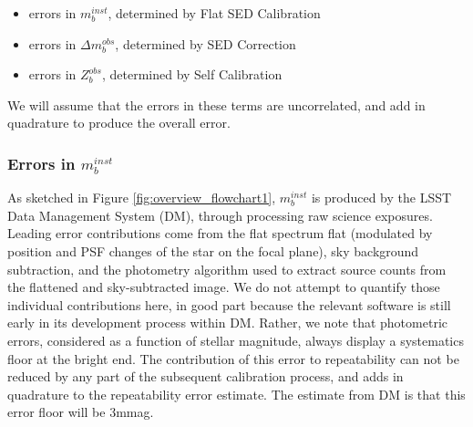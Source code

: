\documentclass[12pt,preprint]{aastex}
\begin{document}
\begin{itemize}
\item{errors in $m_b^{inst}$, determined by Flat SED Calibration}
\item{errors in $\Delta m_b^{obs}$, determined by SED Correction}
\item{errors in $Z_b^{obs}$, determined by Self Calibration}
\end{itemize}

We will assume that the errors in these terms are uncorrelated, and add in quadrature to produce the overall error.

\subsubsection{Errors in $m_b^{inst}$}
As sketched in Figure \ref{fig:overview_flowchart1}, $m_b^{inst}$ is produced by the LSST Data Management System (DM), through processing raw science exposures. Leading error contributions come from the flat spectrum flat (modulated by position and PSF
changes of the star on the focal plane), sky background subtraction, and the photometry algorithm used to extract source counts from the flattened and sky-subtracted image. We do not attempt to quantify those individual contributions here, in good part because the relevant software is still early in its development process within DM. Rather, we note that photometric errors, considered as a function of stellar magnitude, always display a systematics floor at the bright end. The contribution of this error to repeatability can not be reduced by any part of the subsequent calibration process, and adds in quadrature to the repeatability error estimate. The estimate from DM is that this error floor will be 3mmag. 
\end{document}

